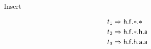 
\begin{block}{Insert}
	\def\TRIEWIDTH{4cm}
	\def\TEXTWIDTH{\textwidth-\TRIEWIDTH-2em}
	\begin{minipage}{\TEXTWIDTH}
		
		\begin{align*}
			t_1 &\Rightarrow {\mathsf h}.{\mathsf f}.{*}.{*}\\
			t_2 &\Rightarrow {\mathsf h}.{\mathsf f}.{*}.{\mathsf h}.{\mathsf a} \\
			t_3 &\Rightarrow {\mathsf h}.{\mathsf f}.{\mathsf h}.{\mathsf a}.{\mathsf a}
			\end{align*}
	\end{minipage}
	\begin{minipage}{\TRIEWIDTH}
		\def\pyL{-0.3}
		\def\pxL{-0.0}
	\end{minipage}
\end{block}